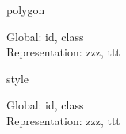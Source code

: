 \begin{Element}{polygon}
    \begin{Required}
    \end{Required}
    \begin{Optional}
        Global: id, class\\
        Representation: zzz, ttt
    \end{Optional}
\end{Element}

\begin{Element}{style}
    \begin{Required}
    \end{Required}
    \begin{Optional}
        Global: id, class\\
        Representation: zzz, ttt
    \end{Optional}
\end{Element}


